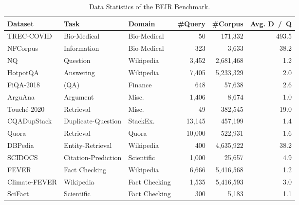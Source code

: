 \label{appx:datasets}
\begin{table*}[t!]
    \centering
    \small
    \begin{tabular}{ l | l | l | r | r | r }
       \hline
           \textbf{Dataset } &\textbf{Task } & \textbf{Domain } & \textbf{\#Query} & \textbf{\#Corpus} & \textbf{Avg. D~/~Q } \\
         \hline
    TREC-COVID          & Bio-Medical          & Bio-Medical & 50     & 171,332   & 493.5 \\
    NFCorpus           & Information          & Bio-Medical & 323    & 3,633     & 38.2 \\ \hline
    NQ                 & Question             & Wikipedia  & 3,452 & 2,681,468 & 1.2    \\
    HotpotQA           & Answering            & Wikipedia  & 7,405  & 5,233,329 & 2.0 \\
    FiQA-2018          & (QA)                 & Finance    & 648    & 57,638    & 2.6 \\ \hline
    ArguAna            & Argument             & Misc.      & 1,406  & 8,674     & 1.0 \\
    Touch\'e-2020      & Retrieval            & Misc.      & 49     & 382,545   & 19.0\\ \hline
    CQADupStack        & Duplicate-Question   & StackEx.   & 13,145 & 457,199   & 1.4 \\
    Quora              & Retrieval            & Quora      & 10,000 & 522,931   & 1.6  \\ \hline
    DBPedia            & Entity-Retrieval     & Wikipedia  & 400    & 4,635,922 & 38.2\\ \hline
    SCIDOCS            & Citation-Prediction  & Scientific & 1,000  & 25,657    & 4.9 \\ \hline
    FEVER              & Fact Checking        & Wikipedia  & 6,666  & 5,416,568 & 1.2\\ 
    Climate-FEVER      & Wikipedia            & Fact Checking & 1,535  & 5,416,593 & 3.0  \\
    SciFact            & Scientific           & Fact Checking & 300   & 5,183     & 1.1\\
    \hline
    \end{tabular}
    \caption{Data Statistics of the BEIR Benchmark.}
    \label{tab:dataset_stats}
\end{table*}

